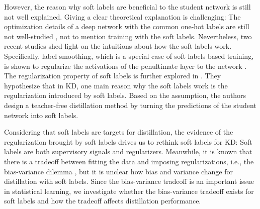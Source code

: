 \documentclass{article} \usepackage{iclr2021_conference,times}
\begin{document}
However, the reason why soft labels are beneficial to the student network is still not well explained. Giving a clear theoretical explanation is challenging: The optimization details of a deep network with the common one-hot labels are still not well-studied \citep{NIPS2019_9336}, not to mention training with the soft labels. Nevertheless, two recent studies \citep{muller2019does,yuan2020revisiting} shed light on the intuitions about how the soft labels work. Specifically, label smoothing, which is a special case of soft labels based training, is shown to regularize the activations of the penultimate layer to the network \citep{muller2019does}. The regularization property of soft labels is further explored in \citep{yuan2020revisiting}. They hypothesize that in KD, one main reason why the soft labels work is the regularization introduced by soft labels. Based on the assumption, the authors design a teacher-free distillation method by turning the predictions of the student network into soft labels. 

Considering that soft labels are targets for distillation, the evidence of the regularization brought by soft labels drives us to rethink soft labels for KD: Soft labels are both supervisory signals and regularizers.
Meanwhile, it is known that there is a tradeoff between fitting the data and imposing regularizations, i.e., the bias-variance dilemma \citep{kohavi1996bias,bishop2006pattern}, but it is unclear how bias and variance change for distillation with soft labels.
Since the bias-variance tradeoff is an important issue in statistical learning, we investigate whether the bias-variance tradeoff exists for soft labels and how the tradeoff affects distillation performance.
\end{document}
